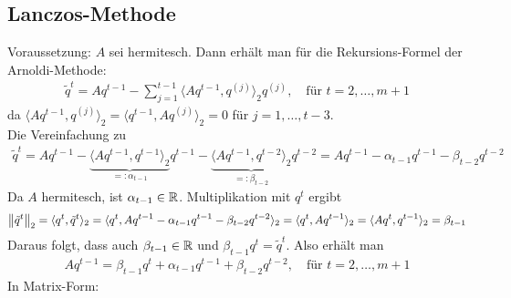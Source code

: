 \subsection{Lanczos-Methode}
Voraussetzung: $A$ sei hermitesch. Dann erhält man für die Rekursions-Formel der Arnoldi-Methode:
\begin{align*}
  \tilde{q}^t = Aq^{t-1} - \sum_{j=1}^{t-1} \langle Aq^{t-1}, q^{(j)}\rangle_2 q^{(j)}, \quad \text{für } t=2,\dots,m+1
\end{align*}
da $\langle Aq^{t-1}, q^{(j)}\rangle_2 = \langle q^{t-1}, Aq^{(j)}\rangle_2 = 0$ für $j=1,\dots,t-3$. \\
Die Vereinfachung zu 
\begin{align*}\tilde{q}^t = Aq^{t-1} - \underbrace{\langle Aq^{t-1}, q^{t-1}\rangle_2}_{=:\alpha_{t-1}} q^{t-1}
- \underbrace{\langle Aq^{t-1}, q^{t-2}\rangle_2}_{=:\beta_{t-2}} q^{t-2} = Aq^{t-1}-\alpha_{t-1}q^{t-1}-\beta_{t-2}q^{t-2}\end{align*}
Da $A$ hermitesch, ist $\alpha_{t-1}\in\mathbb R$. Multiplikation mit $q^t$ ergibt
\begin{align*}
  \vertn{2}{\tilde{q}^t}_2 = \langle q^t, \tilde{q}^t\rangle_2 = \langle q^t, Aq^{t-1}-\alpha_{t-1}q^{t-1}-\beta_{t-2}q^{t-2}\rangle_2 
  = \langle q^t, Aq^{t-1}\rangle_2 = \langle Aq^t, q^{t-1}\rangle_2 = \beta_{t-1}
\end{align*}
Daraus folgt, dass auch $\beta_{t-1}\in\mathbb R$ und $\beta_{t-1}q^t = \tilde{q}^t$. Also erhält man 
\begin{align*}
  Aq^{t-1} = \beta_{t-1}q^t + \alpha_{t-1}q^{t-1} + \beta_{t-2}q^{t-2},\quad\text{für } t=2,\dots,m+1
\end{align*}
In Matrix-Form:

